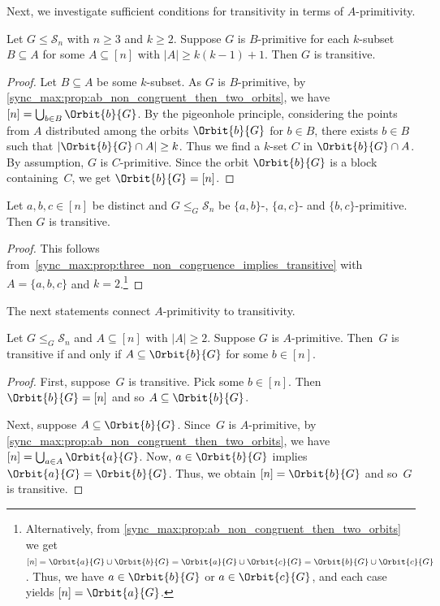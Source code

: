 Next, we investigate sufficient conditions for transitivity
in terms of $A$-primitivity.

\begin{proposition}
	\label{sync_max:prop:three_non_congruence_implies_transitive} 
	Let $G \le \mathcal S_n$ with $n \ge 3$ and $k \ge 2$.
	Suppose $G$ is $B$-primitive
	for each $k$-subset $B \subseteq A$
	for some $A \subseteq [n]$ with $|A| \ge k(k-1) + 1$.
	Then $G$ is transitive.
\end{proposition}
\begin{proof}
	Let $B \subseteq A$ be some $k$-subset.
	As $G$ is $B$-primitive, by \cref{sync_max:prop:ab_non_congruent_then_two_orbits}, 
	we have $[n] = \bigcup_{b \in B} \Orbit{b}{G}$. 
	By the pigeonhole principle,
	considering the points from $A$
	distributed among the orbits $\Orbit{b}{G}$ for $b \in B$,
	there exists $b \in B$
	such that $| \Orbit{b}{G} \cap A | \ge k$.
	Thus we find a $k$-set $C$ in $\Orbit{b}{G} \cap A$.
	By assumption, $G$ is $C$-primitive.
	Since the orbit $\Orbit{b}{G}$ 
	is a block containing~$C$, we get $\Orbit{b}{G} = [n]$.
\end{proof}

\begin{corollary}
	\label{sync_max:cor:three_non_congruence_implies_transitive} 
	Let $a,b,c \in [n]$ be distinct	and $G \le_G \mathcal S_n$ be $\{a,b\}$-, $\{a,c\}$- and $\{b,c\}$-primitive.
	Then $G$ is transitive.
\end{corollary} 
\begin{proof}
	This follows from~\cref{sync_max:prop:three_non_congruence_implies_transitive} with
	$A = \{a,b,c\}$ and $k = 2$.\footnote{Alternatively,
		from \cref{sync_max:prop:ab_non_congruent_then_two_orbits}
		we get $[n] = \Orbit{a}{G} \cup \Orbit{b}{G} = \Orbit{a}{G} \cup \Orbit{c}{G} = \Orbit{b}{G} \cup \Orbit{c}{G}$.
		Thus, we have $a \in \Orbit{b}{G}$ or $a \in \Orbit{c}{G}$,
		and each case yields $[n] = \Orbit{a}{G}$.}		
\end{proof} 

The next statements connect $A$-primitivity to transitivity.

\begin{proposition} \label{sync_max:prop:ab-prim-transitive}
	Let $G \le_G \mathcal S_n$ and $A \subseteq [n]$ with $|A| \ge 2$.
	Suppose $G$ is $A$-primitive.
	Then~$G$ is transitive if and only if $A \subseteq \Orbit{b}{G}$
	for some $b \in [n]$.
\end{proposition}
\begin{proof}
	First, suppose~$G$ is transitive.
	Pick some $b \in [n]$. Then $\Orbit{b}{G} = [n]$
	and so $A \subseteq \Orbit{b}{G}$.
	
	Next, suppose $A \subseteq \Orbit{b}{G}$.
	Since~$G$ is $A$-primitive,
	by \cref{sync_max:prop:ab_non_congruent_then_two_orbits},
	we have $[n] = \bigcup_{a \in A} \Orbit{a}{G}$.
	Now, $a \in \Orbit{b}{G}$
	implies $\Orbit{a}{G} = \Orbit{b}{G}$.
	Thus, we obtain $[n] = \Orbit{b}{G}$
	and so~$G$ is transitive.	 	
\end{proof}

